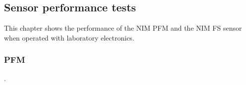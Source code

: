 		
	\subsection{Sensor performance tests}
		This chapter shows the performance of the NIM PFM and the NIM FS sensor when operated with laboratory electronics.
		
		\subsubsection{PFM}\label{sec:paper}
		.	
		\newpage
